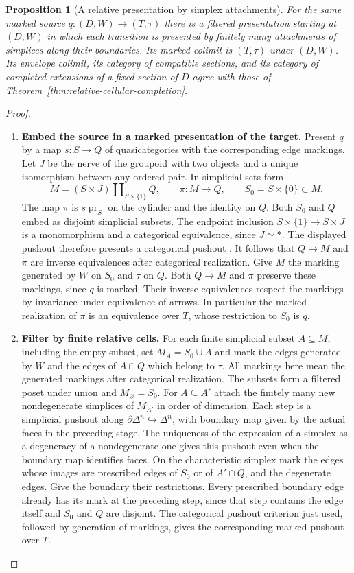 \documentclass[oneside]{article}
\theoremstyle{plain}
\newtheorem{proposition}[theorem]{Proposition}
\theoremstyle{definition}
\theoremstyle{remark}
\begin{document}
\begin{proposition}[A relative presentation by simplex attachments]
\label{prop:relative-simplex-attachments}
For the same marked source $q:(D,W)\to(T,\tau)$ there is a filtered
presentation starting at $(D,W)$ in which each transition is presented
by finitely many attachments of simplices along their boundaries.
Its marked colimit is $(T,\tau)$ under $(D,W)$. Its envelope colimit,
its category of compatible sections, and its category of completed
extensions of a fixed section of $D$ agree with those of
Theorem~\ref{thm:relative-cellular-completion}.
\end{proposition}
\begin{proof}
\leavevmode
\begin{enumerate}
\item \textbf{Embed the source in a marked presentation of the target.}
Present $q$ by a map $s:S\to Q$ of quasicategories with the
corresponding edge markings. Let $J$ be the nerve of the groupoid
with two objects and a unique isomorphism between any ordered pair.
In simplicial sets form
\[
 M=(S\times J)\amalg_{S\times\{1\}}Q,\qquad
 \pi:M\longrightarrow Q,\qquad S_0=S\times\{0\}\subset M .
\]
The map $\pi$ is $s\operatorname{pr}_S$ on the cylinder and the
identity on $Q$. Both $S_0$ and $Q$ embed as disjoint simplicial
subsets. The endpoint inclusion $S\times\{1\}\to S\times J$ is a
monomorphism and a categorical equivalence, since $J\simeq *$.
The displayed pushout therefore presents a categorical pushout
\cite[Ex.~4.5.5.12]{Kerodon}. It follows that $Q\to M$ and
$\pi$ are inverse equivalences after categorical realization.
Give $M$ the marking generated by $W$ on $S_0$ and $\tau$ on $Q$.
Both $Q\to M$ and $\pi$ preserve these markings, since $q$ is
marked. Their inverse equivalences respect the markings by
invariance under equivalence of arrows. In particular the marked
realization of $\pi$ is an equivalence over $T$, whose restriction
to $S_0$ is $q$.

\item \textbf{Filter by finite relative cells.}
For each finite simplicial subset $A\subseteq M$, including the
empty subset, set $M_A=S_0\cup A$ and mark the edges generated by
$W$ and the edges of $A\cap Q$ which belong to $\tau$. All
markings here mean the generated markings after categorical
realization. The subsets form a filtered poset under union and
$M_\varnothing=S_0$. For $A\subseteq A'$ attach the finitely many
new nondegenerate simplices of $M_{A'}$ in order of dimension.
Each step is a simplicial pushout along
$\partial\Delta^n\hookrightarrow\Delta^n$, with boundary map
given by the actual faces in the preceding stage. The uniqueness of
the expression of a simplex as a degeneracy of a nondegenerate one
gives this pushout even when the boundary map identifies faces.
On the characteristic simplex mark the edges whose images are
prescribed edges of $S_0$ or of $A'\cap Q$, and the degenerate
edges. Give the boundary their restrictions. Every prescribed
boundary edge already has its mark at the preceding step, since
that step contains the edge itself and $S_0$ and $Q$ are disjoint.
The categorical pushout criterion just used,
followed by generation of markings, gives the corresponding marked
pushout over $T$.


\end{enumerate}
\end{proof}
\end{document}
